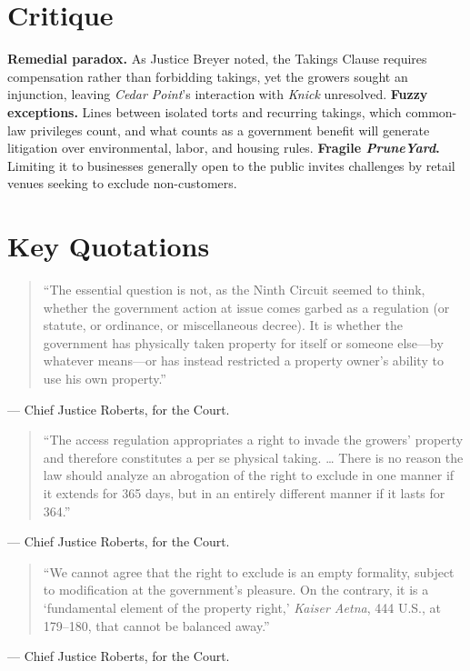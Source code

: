 \documentclass[12pt]{article}
\begin{document}
\section{Critique}

\textbf{Remedial paradox.} As Justice Breyer noted, the Takings Clause requires compensation rather than forbidding takings, yet the growers sought an injunction, leaving \textit{Cedar Point}'s interaction with \textit{Knick} unresolved. \textbf{Fuzzy exceptions.} Lines between isolated torts and recurring takings, which common-law privileges count, and what counts as a government benefit will generate litigation over environmental, labor, and housing rules. \textbf{Fragile \textit{PruneYard}.} Limiting it to businesses generally open to the public invites challenges by retail venues seeking to exclude non-customers.

\section{Key Quotations}

\begin{quote}
``The essential question is not, as the Ninth Circuit seemed to think, whether the government action at issue comes garbed as a regulation (or statute, or ordinance, or miscellaneous decree). It is whether the government has physically taken property for itself or someone else---by whatever means---or has instead restricted a property owner's ability to use his own property.''
\end{quote}
\noindent --- Chief Justice Roberts, for the Court.

\begin{quote}
``The access regulation appropriates a right to invade the growers' property and therefore constitutes a per se physical taking. \ldots{} There is no reason the law should analyze an abrogation of the right to exclude in one manner if it extends for 365 days, but in an entirely different manner if it lasts for 364.''
\end{quote}
\noindent --- Chief Justice Roberts, for the Court.

\begin{quote}
``We cannot agree that the right to exclude is an empty formality, subject to modification at the government's pleasure. On the contrary, it is a `fundamental element of the property right,' \textit{Kaiser Aetna}, 444 U.S., at 179--180, that cannot be balanced away.''
\end{quote}
\noindent --- Chief Justice Roberts, for the Court.
\end{document}

